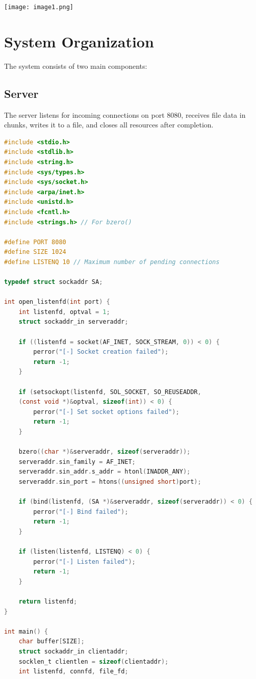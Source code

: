 \documentclass{article}
\begin{document}
\texttt{[image: image1.png]}

\section{System Organization}

The system consists of two main components:

\subsection{Server}

The server listens for incoming connections on port 8080, receives file data in chunks, writes it to a file, and closes all resources after completion.
\begin{lstlisting}[language=C, caption=Sever C Code, label=lst:code]
#include <stdio.h>
#include <stdlib.h>
#include <string.h>
#include <sys/types.h>
#include <sys/socket.h>
#include <arpa/inet.h>
#include <unistd.h>
#include <fcntl.h>
#include <strings.h> // For bzero()

#define PORT 8080
#define SIZE 1024
#define LISTENQ 10 // Maximum number of pending connections

typedef struct sockaddr SA;

int open_listenfd(int port) {
    int listenfd, optval = 1;
    struct sockaddr_in serveraddr;

    if ((listenfd = socket(AF_INET, SOCK_STREAM, 0)) < 0) {
        perror("[-] Socket creation failed");
        return -1;
    }

    if (setsockopt(listenfd, SOL_SOCKET, SO_REUSEADDR, 
    (const void *)&optval, sizeof(int)) < 0) {
        perror("[-] Set socket options failed");
        return -1;
    }

    bzero((char *)&serveraddr, sizeof(serveraddr));
    serveraddr.sin_family = AF_INET;
    serveraddr.sin_addr.s_addr = htonl(INADDR_ANY);
    serveraddr.sin_port = htons((unsigned short)port);

    if (bind(listenfd, (SA *)&serveraddr, sizeof(serveraddr)) < 0) {
        perror("[-] Bind failed");
        return -1;
    }

    if (listen(listenfd, LISTENQ) < 0) {
        perror("[-] Listen failed");
        return -1;
    }

    return listenfd;
}

int main() {
    char buffer[SIZE];
    struct sockaddr_in clientaddr;
    socklen_t clientlen = sizeof(clientaddr);
    int listenfd, connfd, file_fd;


\end{lstlisting}
\end{document}
